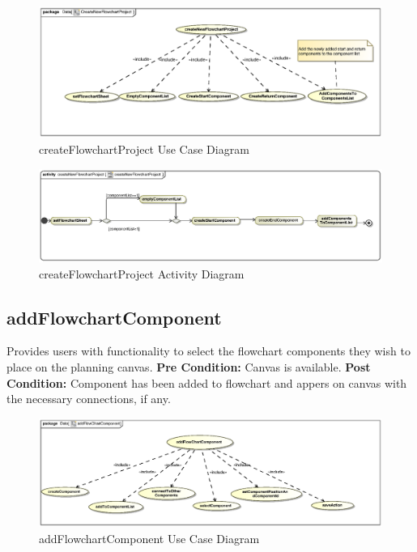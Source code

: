 \documentclass[12pt,a4paper,titlepage]{article}
\begin{document}
\begin{figure}[H]
  \centering
\includegraphics[width=500px]{createNewFlowchartProject.eps}
\caption{createFlowchartProject Use Case Diagram}
\end{figure}

\begin{figure}[H]
  \centering
\includegraphics[width=500px]{createNewFlowchartProjectActivity.eps}
\caption{createFlowchartProject Activity Diagram}
\end{figure}

\newpage
\subsection{addFlowchartComponent}

Provides users with functionality to select the flowchart components they wish to place on the planning canvas.\newline\newline
\textbf{Pre Condition:} Canvas is available.\newline\newline
\textbf{Post Condition:} Component has been added to flowchart and appers on canvas with the necessary connections, if any.

\begin{figure}[H]
  \centering
\includegraphics[width=500px]{addFlowChartComponent.eps}
\caption{addFlowchartComponent Use Case Diagram}
\end{figure}
\end{document}
